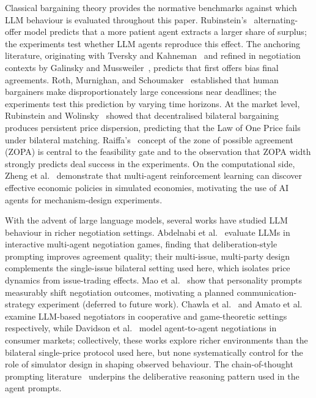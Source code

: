 Classical bargaining theory provides the normative benchmarks against which LLM behaviour is evaluated throughout this paper.  Rubinstein's~\cite{rubinstein1982} alternating-offer model predicts that a more patient agent extracts a larger share of surplus; the experiments test whether LLM agents reproduce this effect.  The anchoring literature, originating with Tversky and Kahneman~\cite{tversky1974} and refined in negotiation contexts by Galinsky and Mussweiler~\cite{galinsky2001}, predicts that first offers bias final agreements.  Roth, Murnighan, and Schoumaker~\cite{roth1988deadline} established that human bargainers make disproportionately large concessions near deadlines; the experiments test this prediction by varying time horizons.  At the market level, Rubinstein and Wolinsky~\cite{rubinstein1985} showed that decentralised bilateral bargaining produces persistent price dispersion, predicting that the Law of One Price fails under bilateral matching.  Raiffa's~\cite{raiffa1982} concept of the zone of possible agreement (ZOPA) is central to the feasibility gate and to the observation that ZOPA width strongly predicts deal success in the experiments.  On the computational side, Zheng et al.~\cite{zheng2020aieconomist} demonstrate that multi-agent reinforcement learning can discover effective economic policies in simulated economies, motivating the use of AI agents for mechanism-design experiments.

With the advent of large language models, several works have studied LLM behaviour in richer negotiation settings.  Abdelnabi et al.~\cite{abdelnabi2024llmdeliberation} evaluate LLMs in interactive multi-agent negotiation games, finding that deliberation-style prompting improves agreement quality; their multi-issue, multi-party design complements the single-issue bilateral setting used here, which isolates price dynamics from issue-trading effects.  Mao et al.~\cite{mao2024personalities} show that personality prompts measurably shift negotiation outcomes, motivating a planned communication-strategy experiment (deferred to future work).  Chawla et al.~\cite{chawla2023assistive} and Amato et al.~\cite{amato2024socialbehavior} examine LLM-based negotiators in cooperative and game-theoretic settings respectively, while Davidson et al.~\cite{davidson2024automatedrisky} model agent-to-agent negotiations in consumer markets; collectively, these works explore richer environments than the bilateral single-price protocol used here, but none systematically control for the role of simulator design in shaping observed behaviour.  The chain-of-thought prompting literature~\cite{wei2022chain} underpins the deliberative reasoning pattern used in the agent prompts.

